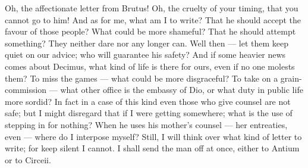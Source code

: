 

 Oh, the affectionate letter from Brutus! Oh, the cruelty of your timing, that you cannot go to him! And as for me, what am I to write? That he should accept the favour of those people? What could be more shameful? That he should attempt something? They neither dare nor any longer can. Well then --- let them keep quiet on our advice; who will guarantee his safety? And if some heavier news comes about Decimus, what kind of life is there for ours, even if no one molests them? To miss the games --- what could be more disgraceful? To take on a grain-commission --- what other office is the embassy of Dio, or what duty in public life more sordid? In fact in a case of this kind even those who give counsel are not safe; but I might disregard that if I were getting somewhere; what is the use of stepping in for nothing? When he uses his mother's counsel --- her entreaties, even --- where do I interpose myself? Still, I will think over what kind of letter to write; for keep silent I cannot. I shall send the man off at once, either to Antium or to Circeii.
